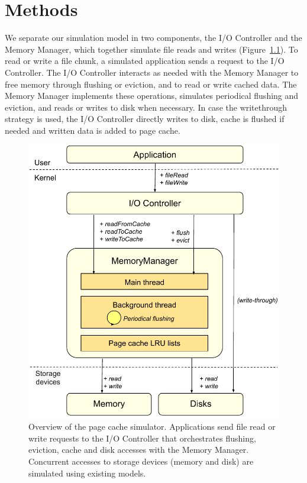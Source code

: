 \chapter{Methods}
\label{method}
We separate our simulation model in two components, the I/O
Controller and the Memory Manager, which together simulate
file reads and writes (Figure~\ref{fig:interaction}).
To read or write a file chunk, a simulated application sends a
request to the I/O Controller. The I/O Controller interacts as needed with
the Memory Manager to free memory through flushing or eviction,
and to read or write cached data. The Memory Manager
implements these operations, simulates periodical flushing
and eviction, and reads or writes to disk when necessary.
In case the writethrough strategy is used, the I/O Controller directly writes to disk, 
cache is flushed if needed and written data is added to page cache.

\begin{figure}
       \centering
       \includegraphics[width=0.85\columnwidth]{figures/interaction.pdf}
       \caption{Overview of the page cache simulator.
       Applications send file read or write requests to the
       I/O Controller that orchestrates flushing, eviction, cache
       and disk accesses with the Memory Manager. Concurrent accesses to storage
       devices (memory and disk) are simulated using existing models.}
       \label{fig:interaction}
\end{figure}






